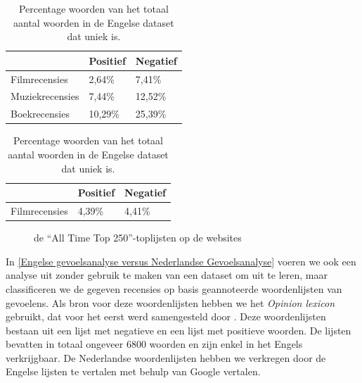 \begin{table}[h]
\centering
\setlength\tabcolsep{2pt}
\begin{minipage}[t]{0.48\textwidth}
\centering
\begin{tabular}{l|l|l|}
\cline{2-3}
                                      & Positief & Negatief \\ \hline
\multicolumn{1}{|l|}{Filmrecensies}   & 2,64\%   & 7,41\%   \\ \hline
\multicolumn{1}{|l|}{Muziekrecensies} & 7,44\%   & 12,52\%  \\ \hline
\multicolumn{1}{|l|}{Boekrecensies}   & 10,29\%  & 25,39\%  \\ \hline
\end{tabular}

\caption{Percentage woorden van het totaal aantal woorden in de Nederlandse dataset dat uniek is.} 
\end{minipage}%
\hfill
\begin{minipage}[t]{0.48\textwidth}
\centering
\begin{tabular}{l|l|l|}
\cline{2-3}
                                    & Positief & Negatief \\ \hline
\multicolumn{1}{|l|}{Filmrecensies} & 4,39\%   & 4,41\%   \\ \hline
\end{tabular}
\caption{Percentage woorden van het totaal aantal woorden in de Engelse dataset dat uniek is.} 
\end{minipage}
\end{table}

\newpage
\begin{figure}%
    \centering
    \caption{de ``All Time Top 250''-toplijsten op de websites}%
\end{figure}

In \ref{Engelse gevoelsanalyse versus Nederlandse Gevoelsanalyse} voeren we ook een analyse uit zonder gebruik te maken van een dataset om uit te leren, maar classificeren we de gegeven recensies op basis geannoteerde woordenlijsten van gevoelens.  
Als bron voor deze woordenlijsten hebben we het \textit{Opinion lexicon} gebruikt, dat voor het eerst werd samengesteld door \cite{hu2004mining}. Deze woordenlijsten bestaan uit een lijst met negatieve en een lijst met positieve woorden. De lijsten bevatten in totaal ongeveer 6800 woorden en zijn enkel in het Engels verkrijgbaar. De Nederlandse woordenlijsten hebben we verkregen door de Engelse lijsten te vertalen met behulp van Google vertalen.\\

